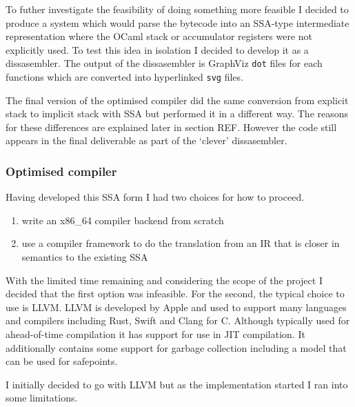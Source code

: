 To futher investigate the feasibility of doing something more feasible I decided to produce a
system which would parse the bytecode into an SSA-type intermediate representation where the OCaml
stack or accumulator registers were not explicitly used. To test this idea in isolation I decided
to develop it as a dissasembler. The output of the dissasembler is GraphViz \texttt{dot} files for
each functions which are converted into hyperlinked \texttt{svg} files.

The final version of the optimised compiler did the same conversion from explicit stack to implicit
stack with SSA but performed it in a different way. The reasons for these differences are explained
later in section REF. However the code still appears in the final deliverable as part of the
`clever' dissasembler.

\subsubsection{Optimised compiler}

Having developed this SSA form I had two choices for how to proceed.

\begin{enumerate}
    \item write an x86\_64 compiler backend from scratch
    \item use a compiler framework to do the translation from an IR that is closer in semantics to
          the existing SSA
\end{enumerate}

With the limited time remaining and considering the scope of the project I decided that the first
option was infeasible. For the second, the typical choice to use is LLVM. LLVM is developed by
Apple and used to support many languages and compilers including Rust, Swift and Clang for C.
Although typically used for ahead-of-time compilation it has support for use in JIT compilation. It
additionally contains some support for garbage collection including a model that can be used for
safepoints.

I initially decided to go with LLVM but as the implementation started I ran into some limitations.

